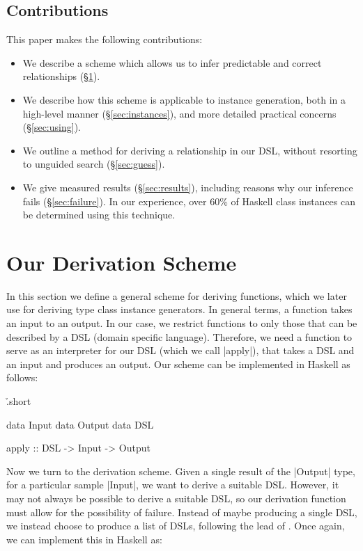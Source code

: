 \documentclass[preprint,draft]{sigplanconf}
\begin{document}
\subsection{Contributions}

This paper makes the following contributions:

\begin{itemize}
\item We describe a scheme which allows us to infer predictable and correct relationships (\S\ref{sec:scheme}).
\item We describe how this scheme is applicable to instance generation, both in a high-level manner (\S\ref{sec:instances}), and more detailed practical concerns (\S\ref{sec:using}).
\item We outline a method for deriving a relationship in our DSL, without resorting to unguided search (\S\ref{sec:guess}).
\item We give measured results (\S\ref{sec:results}), including reasons why our inference fails (\S\ref{sec:failure}). In our experience, over 60\% of Haskell class instances can be determined using this technique.
\end{itemize}

\section{Our Derivation Scheme}
\label{sec:scheme}

In this section we define a general scheme for deriving functions, which we later use for deriving type class instance generators. In general terms, a function takes an input to an output. In our case, we restrict functions to only those that can be described by a DSL (domain specific language). Therefore, we need a function to serve as an interpreter for our DSL (which we call |apply|), that takes a DSL and an input and produces an output. Our scheme can be implemented in Haskell as follows:

\h{.short}\begin{code}
data Input
data Output
data DSL

apply :: DSL -> Input -> Output
\end{code}

Now we turn to the derivation scheme. Given a single result of the |Output| type, for a particular sample |Input|, we want to derive a suitable DSL. However, it may not always be possible to derive a suitable DSL, so our derivation function must allow for the possibility of failure. Instead of maybe producing a single DSL, we instead choose to produce a list of DSLs, following the lead of \citet{wadler:list_of_successes}. Once again, we can implement this in Haskell as:
\end{document}
